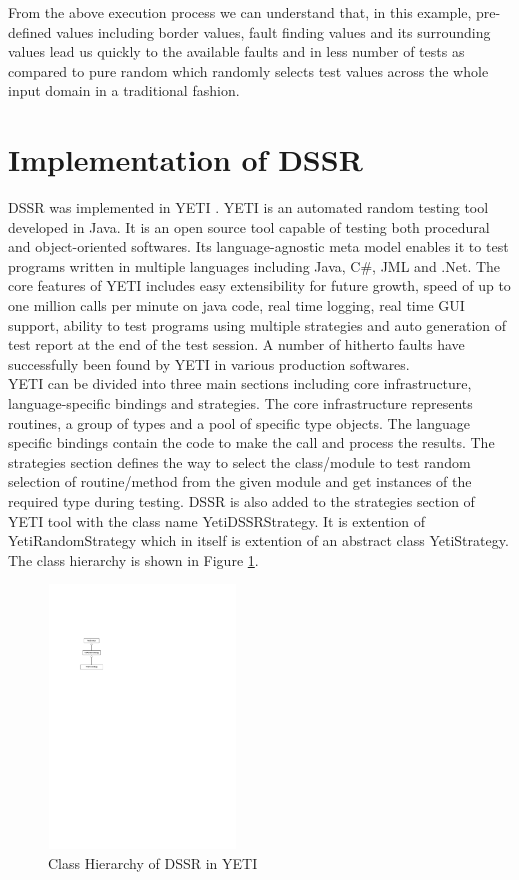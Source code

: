 \documentclass[10pt, conference, compsocconf]{IEEEtran}
\begin{document}
From the above execution process we can understand that, in this example, pre-defined values including border values, fault finding values and its surrounding values lead us quickly to the available faults and in less number of tests as compared to pure random which randomly selects test values across the whole input domain in a traditional fashion.

\section{Implementation of DSSR}\label{sec:implem}

DSSR was implemented in YETI \cite{Oriol2011}. YETI is an automated random testing tool developed in Java. It is an open source tool capable of testing both procedural and object-oriented softwares. Its language-agnostic meta model enables it to test programs written in multiple languages including Java, C\#, JML and .Net. The core features of YETI includes easy extensibility for future growth, speed of up to one million calls per minute on java code, real time logging, real time GUI support, ability to test programs using multiple strategies and auto generation of test report at the end of the test session. A number of hitherto faults have successfully been found by YETI in various production softwares. \\

YETI can be divided into three main sections including core infrastructure, language-specific bindings and strategies. The core infrastructure represents routines, a group of types and a pool of specific type objects. The  language specific bindings contain the code to make the call and process the results. The strategies section defines the way to select the class/module to test random selection of routine/method from the given module and get instances of the required type during testing. DSSR is also added to the strategies section of YETI tool with the class name YetiDSSRStrategy. It is extention of YetiRandomStrategy which in itself is extention of an abstract class YetiStrategy. The class hierarchy is shown in Figure \ref{fig:hierarchyofDSSR}.\\

\begin{figure}[htp]
\centering
\includegraphics[width=5cm,height=7cm]{hierarchy.pdf}
\caption{Class Hierarchy of DSSR in YETI}
\label{fig:hierarchyofDSSR}
\end{figure}
\end{document}
